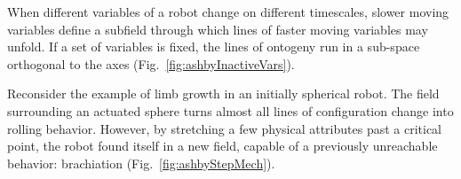 \begin{enumerate}
    When different variables of a robot change on different timescales, slower moving variables define a subfield through which lines of faster moving variables may unfold.
    If a set of variables is fixed, the lines of ontogeny run in a sub-space orthogonal to the axes (Fig.~\ref{fig:ashbyInactiveVars}).
    
    Reconsider the example of limb growth in an initially spherical robot.
    The field 
    surrounding 
    an actuated sphere turns almost all lines of configuration change into rolling behavior.
    However, by stretching a few physical attributes past a critical point,
    the robot found itself in a new field, capable of a previously unreachable behavior: brachiation (Fig.~\ref{fig:ashbyStepMech}).
    
    
    
 
    
    
    
    
    


\end{enumerate}


